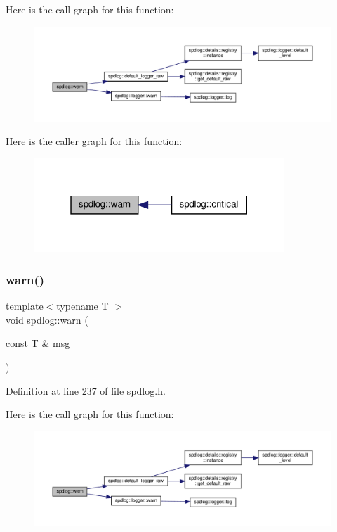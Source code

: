 Here is the call graph for this function\+:
\nopagebreak
\begin{figure}[H]
\begin{center}
\leavevmode
\includegraphics[width=350pt]{namespacespdlog_a41a6d93dee0e1a8c2e6153c1fc7f59df_cgraph}
\end{center}
\end{figure}
Here is the caller graph for this function\+:
\nopagebreak
\begin{figure}[H]
\begin{center}
\leavevmode
\includegraphics[width=268pt]{namespacespdlog_a41a6d93dee0e1a8c2e6153c1fc7f59df_icgraph}
\end{center}
\end{figure}
\mbox{\label{namespacespdlog_ab3df0dca3174a057e99fc327e8c25c57}} 
\subsubsection{\texorpdfstring{warn()}{warn()}\hspace{0.1cm}{\footnotesize\ttfamily [2/2]}}
{\footnotesize\ttfamily template$<$typename T $>$ \\
void spdlog\+::warn (\begin{DoxyParamCaption}\item[{const T \&}]{msg }\end{DoxyParamCaption})\hspace{0.3cm}{\ttfamily [inline]}}



Definition at line 237 of file spdlog.\+h.

Here is the call graph for this function\+:
\nopagebreak
\begin{figure}[H]
\begin{center}
\leavevmode
\includegraphics[width=350pt]{namespacespdlog_ab3df0dca3174a057e99fc327e8c25c57_cgraph}
\end{center}
\end{figure}
